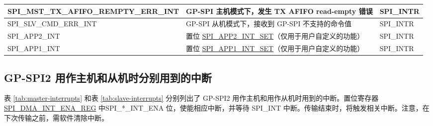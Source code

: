 \documentclass[main\_\_CN.tex]{subfiles}
\begin{document}
\begin{longtable}{ | L{6cm} | L{8.5cm} | L{2.5cm} | }
\label{int:SPIMSTTXAFIFOREMPTYERRINT} SPI\_MST\_TX\_AFIFO\_REMPTY\_ERR\_INT &GP-SPI 主机模式下，发生 TX AFIFO read-empty 错误 & SPI\_INTR \\ \hline
\label{int:SPISLVCMDERRINT} SPI\_SLV\_CMD\_ERR\_INT & GP-SPI 从机模式下，接收到 GP-SPI 不支持的命令值 &SPI\_INTR \\ \hline
\label{int:SPIAPP2INT}SPI\_APP2\_INT & 置位 \hyperref[fielddesc:SPIAPP1INTSET]{SPI\_APP2\_INT\_SET}（仅用于用户自定义的功能）& SPI\_INTR \\ \hline
\label{int:SPIAPP1INT}SPI\_APP1\_INT & 置位 \hyperref[fielddesc:SPIAPP1INTSET]{SPI\_APP1\_INT\_SET}（仅用于用户自定义的功能）& SPI\_INTR \\ \hline
\end{longtable}

\subsection{GP-SPI2 用作主机和从机时分别用到的中断}

表 \ref{tab:master-interrupts} 和表 \ref{tab:slave-interrupts} 分别列出了 GP-SPI2 用作主机和用作从机时用到的中断。置位寄存器 \hyperref[regdesc:SPIDMAINTENAREG]{SPI\_DMA\_INT\_ENA\_REG} 中SPI\_*\_INT\_ENA 位，使能相应中断，并等待 SPI\_INT 中断。传输结束时，将触发相关中断。注意，在下次传输之前，需软件清除中断。
\end{document}
